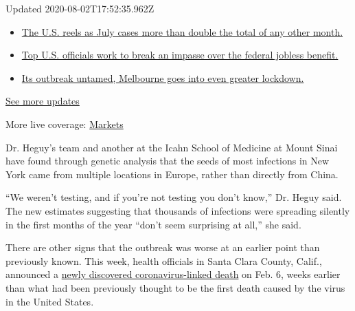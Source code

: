 Updated 2020-08-02T17:52:35.962Z

\begin{itemize}
\tightlist
\item
  \href{https://www.nytimes.com/2020/08/01/world/coronavirus-covid-19.html?action=click\&pgtype=Article\&state=default\&region=MAIN_CONTENT_1\&context=storylines_live_updates\#link-34047410}{The
  U.S. reels as July cases more than double the total of any other
  month.}
\item
  \href{https://www.nytimes.com/2020/08/01/world/coronavirus-covid-19.html?action=click\&pgtype=Article\&state=default\&region=MAIN_CONTENT_1\&context=storylines_live_updates\#link-780ec966}{Top
  U.S. officials work to break an impasse over the federal jobless
  benefit.}
\item
  \href{https://www.nytimes.com/2020/08/01/world/coronavirus-covid-19.html?action=click\&pgtype=Article\&state=default\&region=MAIN_CONTENT_1\&context=storylines_live_updates\#link-2bc8948}{Its
  outbreak untamed, Melbourne goes into even greater lockdown.}
\end{itemize}

\href{https://www.nytimes.com/2020/08/01/world/coronavirus-covid-19.html?action=click\&pgtype=Article\&state=default\&region=MAIN_CONTENT_1\&context=storylines_live_updates}{See
more updates}

More live coverage:
\href{https://www.nytimes.com/live/2020/07/31/business/stock-market-today-coronavirus?action=click\&pgtype=Article\&state=default\&region=MAIN_CONTENT_1\&context=storylines_live_updates}{Markets}

Dr. Heguy's team and another at the Icahn School of Medicine at Mount
Sinai have found through genetic analysis that the seeds of most
infections in New York came from multiple locations in Europe, rather
than directly from China.

``We weren't testing, and if you're not testing you don't know,'' Dr.
Heguy said. The new estimates suggesting that thousands of infections
were spreading silently in the first months of the year ``don't seem
surprising at all,'' she said.

There are other signs that the outbreak was worse at an earlier point
than previously known. This week, health officials in Santa Clara
County, Calif., announced a
\href{https://www.nytimes.com/2020/04/22/us/santa-clara-county-coronavirus-death.html}{newly
discovered coronavirus-linked death} on Feb. 6, weeks earlier than what
had been previously thought to be the first death caused by the virus in
the United States.

